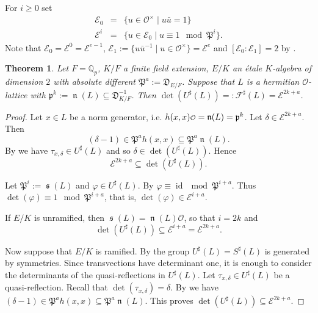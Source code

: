 \documentclass[a4paper]{amsart}
\theoremstyle{definition}
\theoremstyle{plain}
\newtheorem{theorem}[definition]{Theorem}
\DeclareMathOperator{\id}{id}
\DeclareMathOperator{\scale}{\mathfrak{s}}
\DeclareMathOperator{\norm}{\mathfrak{n}}
\newcommand{\QQ}{\mathbb{Q}}
\renewcommand{\O}{\mathcal{O}}
\newcommand{\F}{\mathcal{F}}
\newcommand{\E}{\mathcal{E}}
\newcommand{\fp}{\mathfrak{p}}
\newcommand{\FP}{\mathfrak{P}}
\newcommand{\FD}{\mathfrak{D}}
\renewcommand\o{
  \mathchoice
    {{\scriptstyle\mathcal{O}}}%
    {{\scriptstyle\mathcal{O}}}%
    {{\scriptscriptstyle\mathcal{O}}}%
    {\scalebox{.7}{$\scriptscriptstyle\mathcal{O}$}}%
  }
\newcommand{\sprodq}[2]{h( #1,#1)}
\begin{document}
For $i\geq 0$ set
\begin{eqnarray*}
 \E_0 & = &\{u \in \O^\times \mid u \bar u =1\}\\
\E^i &=& \{u \in \E_0 \mid u \equiv 1 \mod \FP^i\}.
\end{eqnarray*}
Note that $\E_0 = \E^0 = \E^{e-1}$, $\E_1:= \{u \bar u ^{-1} \mid u \in \O^\times\} = \E^e$ and $[\E_0:\E_1]=2$ by \cite[3.4, 3.5]{Kirschmer2019}.

\begin{theorem}\label{detUsharp}
 Let $F=\QQ_p$, $K/F$ a finite field extension, $E/K$ an étale $K$-algebra of dimension $2$ with absolute different $\FP^a:=\FD_{E/F}$.
 Suppose that $L$ is a hermitian $\O$-lattice with $\fp^k:=\norm(L) \subseteq \FD_{K/F}^{-1}$.
 Then $\det(U^\sharp(L)) =:\F^\sharp(L) = \E^{2k+a}$.
\end{theorem}
\begin{proof}
 Let $x \in L$ be a norm generator, i.e. $\sprodq{x}{x} \o = \norm(L) = \fp^k$.
 Let $\delta \in \E^{2k+a}$. Then
 \[(\delta-1) \in \FP^{a}\sprodq{x}{x}\subseteq \FP^{a}\norm(L).\]
 By  we have $\tau_{x,\delta} \in U^\sharp(L)$ and so $\delta \in \det(U^\sharp(L))$. Hence
 \[\E^{2k+a} \subseteq \det(U^\sharp(L)).\]

 Let $\FP^i:=\scale(L)$ and $\varphi \in U^\sharp(L)$. By  $\varphi \equiv \id \mod \FP^{i+a}$. Thus $\det(\varphi) \equiv 1 \mod \FP^{i+a}$, that is, $\det(\varphi) \in \E^{i+a}$.

 If $E/K$ is unramified, then $\scale(L)=\norm(L)\O$, so that $i=2k$ and
 \[\det(U^\sharp(L)) \subseteq \E^{i+a}=\E^{2k+a}.\]

 Now suppose that $E/K$ is ramified.
 By  the group $U^\sharp(L) = S^\sharp(L)$ is generated by symmetries.
 Since transvections have determinant one,
 it is enough to consider the determinants of the quasi-reflections in $U^\sharp(L)$.
 Let $\tau_{x,\delta} \in U^\sharp(L)$ be a quasi-reflection. Recall that $\det(\tau_{x,\delta}) = \delta$.
 By  we have $(\delta -1) \in \FP^a \sprodq{x}{x} \subseteq \FP^a \norm(L)$.
 This proves $\det(U^\sharp(L)) \subseteq \E^{2k + a}$.
%
%
%
%
%
%
%
%
\end{proof}
\end{document}
